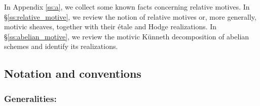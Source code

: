 \documentclass[12pt]{amsart}
\numberwithin{equation}{section}
\theoremstyle{plain}
\theoremstyle{definition}
\theoremstyle{remark}
\renewcommand{\(}{\left(}
\renewcommand{\)}{\right)}
\begin{document}
In Appendix \ref{ss:a}, we collect some known facts concerning relative motives. In \S\ref{ss:relative_motive}, we review the notion of relative motives or, more generally, motivic sheaves, together with their \'{e}tale and Hodge realizations. In \S\ref{ss:abelian_motive}, we review the motivic K\"{u}nneth decomposition of abelian schemes and identify its realizations.



\subsection{Notation and conventions}
\label{ss:notation}

\subsubsection*{Generalities:}
\end{document}
